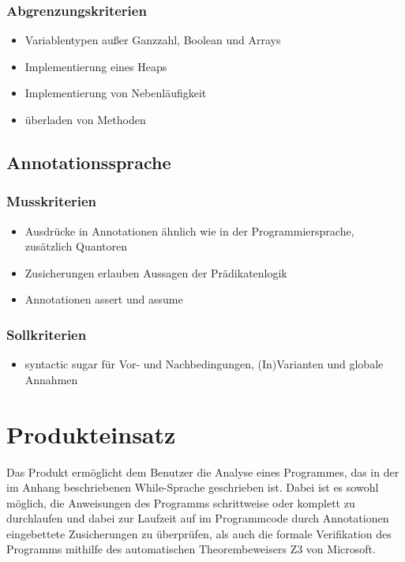 \documentclass[a4paper,10pt]{article}
\begin{document}
\subsubsection{Abgrenzungskriterien}
\begin{itemize}
  \item Variablentypen außer Ganzzahl, Boolean und Arrays
  \item Implementierung eines Heaps
  \item Implementierung von Nebenl\"{a}ufigkeit
  \item \"{u}berladen von Methoden
\end{itemize}

\subsection{Annotationssprache}
\subsubsection{Musskriterien}
\begin{itemize}
  \item Ausdr\"{u}cke in Annotationen \"{a}hnlich wie in der Programmiersprache, zus\"{a}tzlich Quantoren
  \item Zusicherungen erlauben Aussagen der Pr\"{a}dikatenlogik
  \item Annotationen assert und assume
\end{itemize}
\subsubsection{Sollkriterien}
\begin{itemize}
  \item syntactic sugar f\"{u}r Vor- und Nachbedingungen, (In)Varianten und globale Annahmen
\end{itemize}


\section{Produkteinsatz}
Das Produkt erm\"{o}glicht dem Benutzer die Analyse eines Programmes, das in der im Anhang beschriebenen While-Sprache geschrieben ist. Dabei ist es sowohl m\"{o}glich, die Anweisungen des Programms schrittweise oder komplett zu durchlaufen und dabei zur Laufzeit auf im Programmcode durch Annotationen eingebettete Zusicherungen zu \"{u}berpr\"{u}fen, als auch die formale Verifikation des Programms mithilfe des automatischen Theorembeweisers Z3 von Microsoft.
\end{document}
